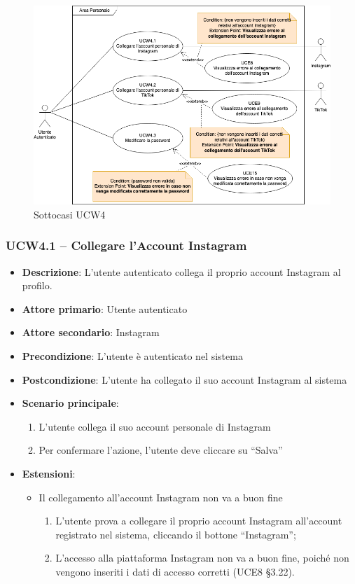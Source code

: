\begin{figure}[!h]
\centering
\includegraphics[scale=0.5]{UC_images/UCW4-1.png}
\caption{Sottocasi UCW4}
\end{figure}
\subsubsection{UCW4.1 – Collegare l'Account Instagram}
\begin{itemize}
\item \textbf{Descrizione}: L'utente autenticato collega il proprio account Instagram al profilo.
\item \textbf{Attore primario}: Utente autenticato
\item \textbf{Attore secondario}: Instagram
\item \textbf{Precondizione}: L’utente è autenticato nel sistema
\item \textbf{Postcondizione}: L’utente ha collegato il suo account Instagram al sistema

\item \textbf{Scenario principale}:
\begin{enumerate}
\item L’utente collega il suo account personale di Instagram
\item Per confermare l’azione, l’utente deve cliccare su “Salva” 
\end{enumerate}

\item \textbf{Estensioni}:
\begin{itemize}
\item Il collegamento all’account Instagram non va a buon fine
\begin{enumerate}
	\item L’utente prova a collegare il proprio account Instagram all’account registrato nel sistema, cliccando il bottone “Instagram”;
	\item L’accesso alla piattaforma Instagram non va a buon fine, poiché non vengono inseriti i dati di accesso corretti (UCE8 §3.22).
\end{enumerate}
\end{itemize}
\end{itemize}

